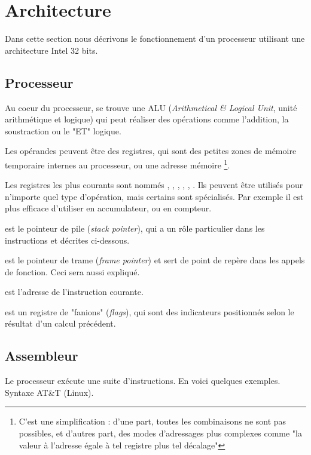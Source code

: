 \section{Architecture}

Dans cette section nous décrivons le fonctionnement d'un processeur utilisant
une architecture Intel 32 bits.

\subsection{Processeur}

Au coeur du processeur, se trouve une ALU (\emph{Arithmetical \& Logical Unit},
unité arithmétique et logique) qui peut réaliser des opérations comme
l'addition, la soustraction ou le "ET" logique.

Les opérandes peuvent être des registres, qui sont des petites zones de mémoire
temporaire internes au processeur, ou une adresse mémoire \footnote{C'est une
simplification : d'une part, toutes les combinaisons ne sont pas possibles, et
d'autres part, des modes d'adressages plus complexes comme "la valeur à
l'adresse égale à tel registre plus tel décalage"}.

Les registres les plus courants sont nommés \eax, \ebx, \ecx, \edx, \esi, \edi.
Ils peuvent être utilisés pour n'importe quel type d'opération, mais certains
sont spécialisés. Par exemple il est plus efficace d'utiliser \eax en
accumulateur, ou \ecx en compteur.

\esp est le pointeur de pile (\emph{stack pointer}), qui a un rôle particulier
dans les instructions  et  décrites ci-dessous.

\ebp est le pointeur de trame (\emph{frame pointer}) et sert de point de repère
dans les appels de fonction. Ceci sera aussi expliqué.

\eip est l'adresse de l'instruction courante.

\eflags est un registre de "fanions" (\emph{flags}), qui sont des indicateurs
positionnés selon le résultat d'un calcul précédent.

\subsection{Assembleur}

Le processeur exécute une suite d'instructions. En voici quelques exemples.
Syntaxe AT\&T (Linux).

